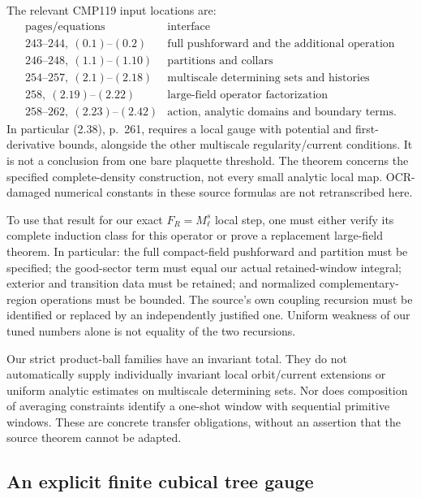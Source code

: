 \documentclass[11pt]{article}
\theoremstyle{remark}
\begin{document}
The relevant CMP119 input locations are:
\[
\begin{array}{c|l}
\text{pages/equations}&\text{interface}\\ \hline
243\text{--}244,\ (0.1)\text{--}(0.2)&
       \text{full pushforward and the additional operation}\\
246\text{--}248,\ (1.1)\text{--}(1.10)&
       \text{partitions and collars}\\
254\text{--}257,\ (2.1)\text{--}(2.18)&
       \text{multiscale determining sets and histories}\\
258,\ (2.19)\text{--}(2.22)&
       \text{large-field operator factorization}\\
258\text{--}262,\ (2.23)\text{--}(2.42)&
       \text{action, analytic domains and boundary terms}.
\end{array}
\]
In particular (2.38), p.~261, requires a local gauge with potential
and first-derivative bounds, alongside the other multiscale
regularity/current conditions. It is not a conclusion from one
bare plaquette threshold. The theorem concerns the specified
complete-density construction, not every small analytic local map.
OCR-damaged numerical constants in these source formulas are not
retranscribed here.

To use that result for our exact \(F_R=M_\ell^s\) local step,
one must either verify its complete induction class for this
operator or prove a replacement large-field theorem. In particular:
the full compact-field pushforward and partition must be specified;
the good-sector term must equal our actual retained-window
integral; exterior and transition data must be retained; and
normalized complementary-region operations must be bounded.
The source's own coupling recursion must be identified or replaced
by an independently justified one. Uniform weakness of our tuned
numbers alone is not equality of the two recursions.

Our strict product-ball families have an invariant total.
They do not automatically supply individually invariant local
orbit/current extensions or uniform analytic estimates on
multiscale determining sets. Nor does composition of averaging
constraints identify a one-shot window with sequential primitive
windows. These are concrete transfer obligations, without an
assertion that the source theorem cannot be adapted.

\subsection{An explicit finite cubical tree gauge}
\label{fmg-tree}
\end{document}

